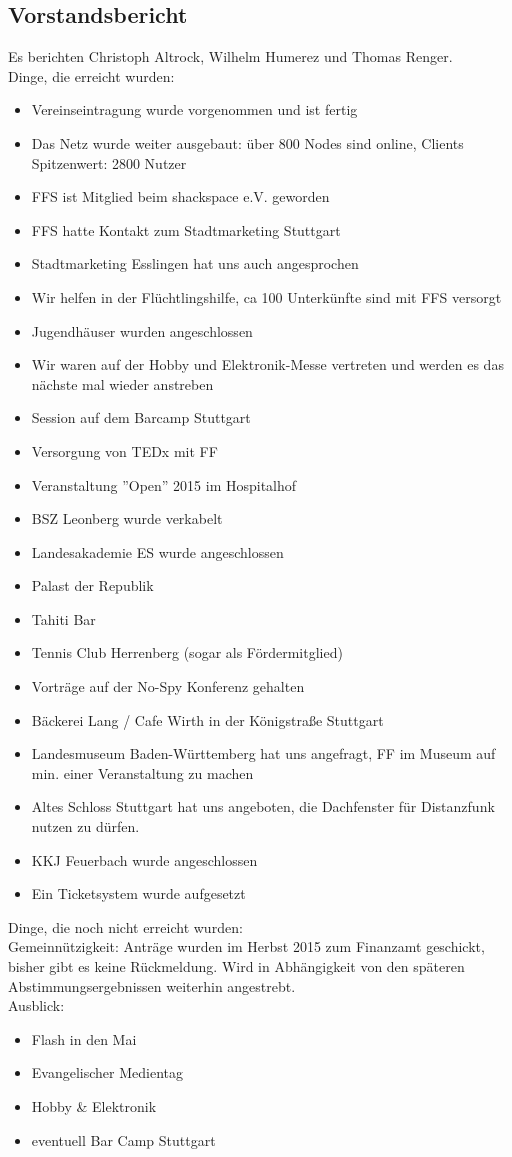 \documentclass[a4paper]{scrartcl}
\begin{document}
\subsection{Vorstandsbericht}
Es berichten Christoph Altrock, Wilhelm Humerez und Thomas Renger.\\
Dinge, die erreicht wurden:
\begin{itemize}
\item Vereinseintragung wurde vorgenommen und ist fertig
\item Das Netz wurde weiter ausgebaut: über 800 Nodes sind online, Clients Spitzenwert: 2800 Nutzer
\item FFS ist Mitglied beim shackspace e.V. geworden
\item FFS hatte Kontakt zum Stadtmarketing Stuttgart
\item Stadtmarketing Esslingen hat uns auch angesprochen
\item Wir helfen in der Flüchtlingshilfe, ca 100 Unterkünfte sind mit FFS versorgt
\item Jugendhäuser wurden angeschlossen
\item Wir waren auf der Hobby und Elektronik-Messe vertreten und werden es das nächste mal wieder anstreben
\item Session auf dem Barcamp Stuttgart
\item Versorgung von TEDx mit FF
\item Veranstaltung ''Open'' 2015 im Hospitalhof
\item BSZ Leonberg wurde verkabelt
\item Landesakademie ES wurde angeschlossen
\item Palast der Republik
\item Tahiti Bar
\item Tennis Club Herrenberg (sogar als Fördermitglied)
\item Vorträge auf der No-Spy Konferenz gehalten
\item Bäckerei Lang / Cafe Wirth in der Königstraße Stuttgart
\item Landesmuseum Baden-Württemberg hat uns angefragt, FF im Museum auf min. einer Veranstaltung zu machen
\item Altes Schloss Stuttgart hat uns angeboten, die Dachfenster für Distanzfunk nutzen zu dürfen.
\item KKJ Feuerbach wurde angeschlossen
\item Ein Ticketsystem wurde aufgesetzt
\end{itemize}
Dinge, die noch nicht erreicht wurden:\\
Gemeinnützigkeit: Anträge wurden im Herbst 2015 zum Finanzamt geschickt, bisher gibt es keine Rückmeldung. Wird in Abhängigkeit von den späteren Abstimmungsergebnissen weiterhin angestrebt.\\
Ausblick:
\begin{itemize}
\item Flash in den Mai
\item Evangelischer Medientag
\item Hobby \& Elektronik
\item eventuell Bar Camp Stuttgart
\end{itemize}
\end{document}
